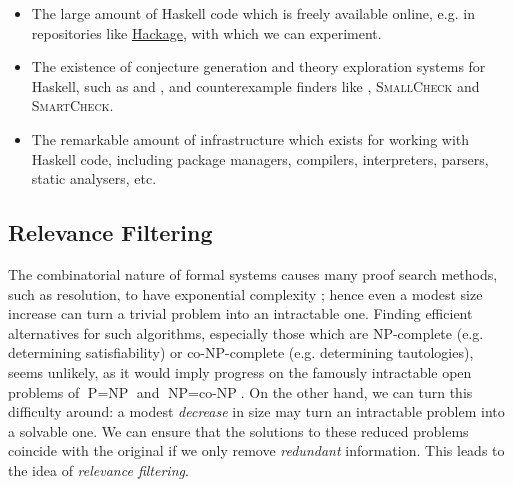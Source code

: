 \begin{itemize}

\item The large amount of Haskell code which is freely available online, e.g. in repositories like \href{http://hackage.haskell.org}{Hackage}, with which we can experiment.

\item The existence of conjecture generation and theory exploration systems for Haskell, such as \qspec{} and \hspec{}, and counterexample finders like \qcheck{}, \textsc{SmallCheck} and \textsc{SmartCheck}.

\item The remarkable amount of infrastructure which exists for working with Haskell code, including package managers, compilers, interpreters, parsers, static analysers, etc.

\end{itemize}

\iffalse

\subsection{Conjecture Generation}

The task of \emph{conjecture generation} lies at the heart of theory exploration, and

\subsubsection{Lemma generation}

\fi

\subsection{Relevance Filtering}
\label{sec:relevance}

\citep{kuhlwein2012overview}

The combinatorial nature of formal systems causes many proof search methods, such as resolution, to have exponential complexity \citep{haken1985intractability}; hence even a modest size increase can turn a trivial problem into an intractable one. Finding efficient alternatives for such algorithms, especially those which are NP-complete (e.g. determining satisfiability) or co-NP-complete (e.g. determining tautologies), seems unlikely, as it would imply progress on the famously intractable open problems of $\text{P} = \text{NP}$ and $\text{NP} = \text{co-NP}$. On the other hand, we can turn this difficulty around: a modest \emph{decrease} in size may turn an intractable problem into a solvable one. We can ensure that the solutions to these reduced problems coincide with the original if we only remove \emph{redundant} information. This leads to the idea of \emph{relevance filtering}.

